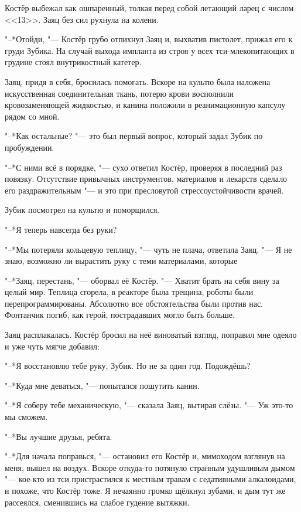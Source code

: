 Костёр выбежал как ошпаренный, толкая перед собой летающий ларец с числом <<13>>.
Заяц без сил рухнула на колени.

"--*Отойди, "--- Костёр грубо отпихнул Заяц и, выхватив пистолет, прижал его к груди Зубика.
На случай выхода импланта из строя у всех тси-млекопитающих в грудине стоял внутрикостный катетер.

Заяц, придя в себя, бросилась помогать.
Вскоре на культю была наложена искусственная соединительная ткань, потерю крови восполнили кровозаменяющей жидкостью, и канина положили в реанимационную капсулу рядом со мной.

"--*Как остальные? "--- это был первый вопрос, который задал Зубик по пробуждении.

"--*С ними всё в порядке, "--- сухо ответил Костёр, проверяя в последний раз повязку.
Отсутствие привычных инструментов, материалов и лекарств сделало его раздражительным "--- и это при пресловутой стрессоустойчивости врачей.

Зубик посмотрел на культю и поморщился.

"--*Я теперь навсегда без руки?

"--*Мы потеряли кольцевую теплицу, "--- чуть не плача, ответила Заяц.
"--- Я не знаю, возможно ли вырастить руку с теми материалами, которые\ldotst

"--*Заяц, перестань, "--- оборвал её Костёр.
"--- Хватит брать на себя вину за целый мир.
Теплица сгорела, в реакторе была трещина, роботы были перепрограммированы.
Абсолютно все обстоятельства были против нас.
Фонтанчик погиб, как герой, пострадавших могло быть больше.

Заяц расплакалась.
Костёр бросил на неё виноватый взгляд, поправил мне одеяло и уже чуть мягче добавил:

"--*Я восстановлю тебе руку, Зубик.
Но не за один год.
Подождёшь?

"--*Куда мне деваться, "--- попытался пошутить канин.

"--*Я соберу тебе механическую, "--- сказала Заяц, вытирая слёзы.
"--- Уж это-то мы сможем.

"--*Вы лучшие друзья, ребята.

"--*Для начала поправься, "--- остановил его Костёр и, мимоходом взглянув на меня, вышел на воздух.
Вскоре откуда-то потянуло странным удушливым дымом "--- кое-кто из тси пристрастился к местным травам с седативными алкалоидами, и похоже, что Костёр тоже.
Я нечаянно громко щёлкнул зубами, и дым тут же рассеялся, сменившись на слабое гудение вытяжки.

